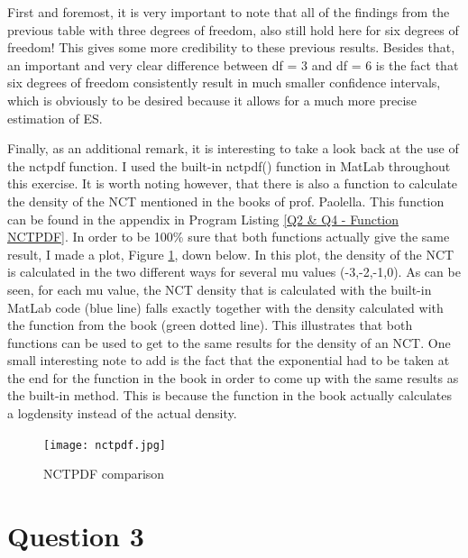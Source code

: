 \documentclass[12pt]{article}
\begin{document}
First and foremost, it is very important to note that all of the findings from the previous table with three degrees of freedom, also still hold here for six degrees of freedom! This gives some more credibility to these previous results. \newline \newline 
Besides that, an important and very clear difference between df = 3 and df = 6 is the fact that six degrees of freedom consistently result in much smaller confidence intervals, which is obviously to be desired because it allows for a much more precise estimation of ES.\newline \newline


\newpage
Finally, as an additional remark, it is interesting to take a look back at the use of the nctpdf function. I used the built-in nctpdf() function in MatLab throughout this exercise. It is worth noting however, that there is also a function to calculate the density of the NCT mentioned in the books of prof. Paolella. This function can be found in the appendix in Program Listing \ref{Q2 & Q4 - Function NCTPDF}. In order to be 100\% sure that both functions actually give the same result, I made a plot, Figure \ref{fig:NCTPDF}, down below. In this plot, the density of the NCT is calculated in the two different ways for several mu values (-3,-2,-1,0). As can be seen, for each mu value, the NCT density that is calculated with the built-in MatLab code (blue line) falls exactly together with the density calculated with the function from the book (green dotted line). This illustrates that both functions can be used to get to the same results for the density of an NCT.\newline  \newline
One small interesting note to add is the fact that the exponential had to be taken at the end for the function in the book in order to come up with the same results as the built-in method. This is because the function in the book actually calculates a logdensity instead of the actual density.

\begin{figure}[!htb]
   \texttt{[image: nctpdf.jpg]}
   \centering
   \caption{NCTPDF comparison}
   \label{fig:NCTPDF}
\end{figure}

\newpage
\section{Question 3}
\end{document}
